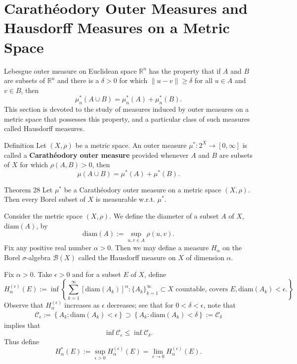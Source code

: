 \section{Carath\'eodory Outer Measures and Hausdorff Measures on a Metric Space}

Lebesgue outer measure on Euclidean space $\mathbb{R}^n$ has the property that if $A$ and $B$ are subsets of $\mathbb{R}^n$ and there is a $\delta>0$ for which $\|u-v\|\ge\delta$ for all $u\in A$ and $v\in B$, then 
\[
    \mu_n^*(A\cup B)=\mu_n^*(A)+\mu_n^*(B).
\]
This section is devoted to the study of measures induced by outer measures on a metric space that possesses this property, and a particular class of such measures called Hausdorff measures.

\begin{namedthm*}{Definition}
    Let $(X,\rho)$ be a metric space.
    An outer measure $\mu^*:2^X\to[0,\infty]$ is called a \textbf{Carath\'eodory outer measure} provided whenever $A$ and $B$ are subsets of $X$ for which $\rho(A,B)>0$, then 
    \[
        \mu(A\cup B)=\mu^*(A)+\mu^*(B).
    \] 
\end{namedthm*}

\begin{namedthm*}{Theorem 28}
    Let $\mu^*$ be a Carath\'eodory outer measure on a metric space $(X,\rho)$.
    Then every Borel subset of $X$ is measurable w.r.t. $\mu^*$.
\end{namedthm*}

Consider the metric space $(X,\rho)$.
We define the diameter of a subset $A$ of $X$, $\text{diam}(A)$, by
\[
    \text{diam}(A):=\sup_{u,v\in A}\rho(u,v).
\]
Fix any positive real number $\alpha>0$.
Then we may define a measure $H_\alpha$ on the Borel $\sigma$-algebra $\mathcal{B}(X)$ called the Hausdorff measure on $X$ of dimension $\alpha$.

Fix $\alpha>0$.
Take $\epsilon>0$ and for a subset $E$ of $X$, define 
\[
    H_\alpha^{(\epsilon)}(E):=\inf
    \left\{
        \sum_{k=1}^\infty[\text{diam}(A_k)]^\alpha:\{A_k\}_{k=1}^\infty\subset X\text{ countable, covers }E,\text{diam}(A_k)<\epsilon.
    \right\}
\]
Observe that $H_\alpha^{(\epsilon)}$ increases as $\epsilon$ decreases;
see that for $0<\delta<\epsilon$, note that 
\begin{align*}
    \mathcal{C}_\epsilon:=\left\{
        A_k:\text{diam}(A_k)<\epsilon
    \right\}
    \supset
    \left\{
        A_k:\text{diam}(A_k)<\delta
    \right\}
    :=\mathcal{C}_{\delta}
\end{align*}
implies that 
\[
    \inf\mathcal{C}_\epsilon\le\inf\mathcal{C}_\delta.
\]
Thus define 
\[
    H_\alpha^*(E):=\sup_{\epsilon>0}H_\alpha^{(\epsilon)}(E)=\lim_{\epsilon\to0}H_\alpha^{(\epsilon)}(E).
\]

